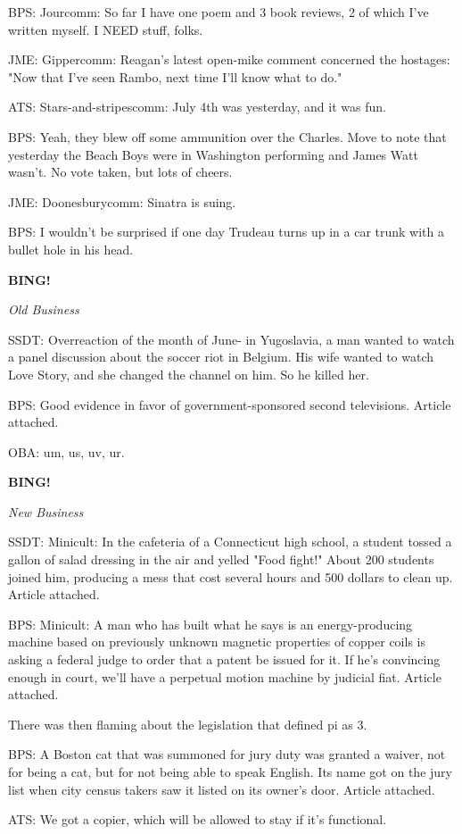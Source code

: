 \documentclass[12pt]{article}
\newcommand{\bing}{{\bf BING!} }
\newcommand{\goto}[1]{\bing \vskip 12pt \centerline{{\em{#1}}}}
\begin{document}
BPS: Jourcomm: So far I have one poem and 3 book reviews, 2 of which I've written myself. I NEED stuff, folks.

JME: Gippercomm: Reagan's latest open-mike comment concerned the hostages: "Now that I've seen Rambo, next time I'll know what to do."

ATS: Stars-and-stripescomm: July 4th was yesterday, and it was fun.

BPS: Yeah, they blew off some ammunition over the Charles. Move to note that yesterday the Beach Boys were in Washington performing and James Watt wasn't. No vote taken, but lots of cheers.

JME: Doonesburycomm: Sinatra is suing.

BPS: I wouldn't be surprised if one day Trudeau turns up in a car trunk with a bullet hole in his head.

\goto{Old Business}

SSDT: Overreaction of the month of June- in Yugoslavia, a man wanted to watch a panel discussion about the soccer riot in Belgium. His wife wanted to watch Love Story, and she changed the channel on him. So he killed her.

BPS: Good evidence in favor of government-sponsored second televisions. Article attached.

OBA: um, us, uv, ur.

\goto{New Business}

SSDT: Minicult: In the cafeteria of a Connecticut high school, a student tossed a gallon of salad dressing in the air and yelled "Food fight!" About 200 students joined him, producing a mess that cost several hours and 500 dollars to clean up. Article attached.

BPS: Minicult: A man who has built what he says is an energy-producing machine based on previously unknown magnetic properties of copper coils is asking a federal judge to order that a patent be issued for it. If he's convincing enough in court, we'll have a perpetual motion machine by judicial fiat. Article attached.

There was then flaming about the legislation that defined pi as 3.

BPS: A Boston cat that was summoned for jury duty was granted a waiver, not for being a cat, but for not being able to speak English. Its name got on the jury list when city census takers saw it listed on its owner's door. Article attached.

ATS: We got a copier, which will be allowed to stay if it's functional.
\end{document}
